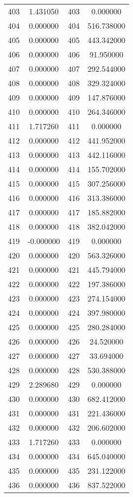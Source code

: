 \documentclass[12pt]{article}
\begin{document}
\begin{longtable}{@{}cccc@{}}
403 & 1.431050 & 403 & 0.000000 \\
404 & 0.000000 & 404 & 516.738000 \\
405 & 0.000000 & 405 & 443.342000 \\
406 & 0.000000 & 406 & 91.950000 \\
407 & 0.000000 & 407 & 292.544000 \\
408 & 0.000000 & 408 & 329.324000 \\
409 & 0.000000 & 409 & 147.876000 \\
410 & 0.000000 & 410 & 264.346000 \\
411 & 1.717260 & 411 & 0.000000 \\
412 & 0.000000 & 412 & 441.952000 \\
413 & 0.000000 & 413 & 442.116000 \\
414 & 0.000000 & 414 & 155.702000 \\
415 & 0.000000 & 415 & 307.256000 \\
416 & 0.000000 & 416 & 313.386000 \\
417 & 0.000000 & 417 & 185.882000 \\
418 & 0.000000 & 418 & 382.042000 \\
419 & -0.000000 & 419 & 0.000000 \\
420 & 0.000000 & 420 & 563.326000 \\
421 & 0.000000 & 421 & 445.794000 \\
422 & 0.000000 & 422 & 197.386000 \\
423 & 0.000000 & 423 & 274.154000 \\
424 & 0.000000 & 424 & 397.980000 \\
425 & 0.000000 & 425 & 280.284000 \\
426 & 0.000000 & 426 & 24.520000 \\
427 & 0.000000 & 427 & 33.694000 \\
428 & 0.000000 & 428 & 530.388000 \\
429 & 2.289680 & 429 & 0.000000 \\
430 & 0.000000 & 430 & 682.412000 \\
431 & 0.000000 & 431 & 221.436000 \\
432 & 0.000000 & 432 & 206.602000 \\
433 & 1.717260 & 433 & 0.000000 \\
434 & 0.000000 & 434 & 645.040000 \\
435 & 0.000000 & 435 & 231.122000 \\
436 & 0.000000 & 436 & 837.522000 \\

\end{longtable}
\end{document}
